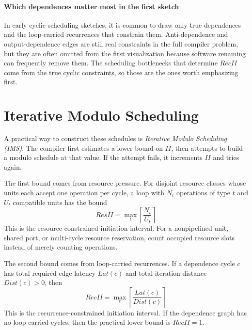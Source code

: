 \paragraph{Which dependences matter most in the first sketch}\label{par:ilp-swpipe-dep-simplify}
In early cyclic-scheduling sketches, it is common to draw only true dependences and the loop-carried recurrences that constrain them.
Anti-dependence and output-dependence edges are still real constraints in the full compiler problem, but they are often omitted from the first visualization because software renaming can frequently remove them.
The scheduling bottlenecks that determine $RecII$ come from the true cyclic constraints, so those are the ones worth emphasizing first.


\section{Iterative Modulo Scheduling}\label{sec:ilp-iterative-modulo-scheduling}
A practical way to construct these schedules is \textit{Iterative Modulo Scheduling (IMS)}.
The compiler first estimates a lower bound on $II$, then attempts to build a modulo schedule at that value.
If the attempt fails, it increments $II$ and tries again.

The first bound comes from resource pressure.
For disjoint resource classes whose units each accept one operation per cycle, a loop with $N_t$ operations of type $t$ and $U_t$ compatible units has the bound
\begin{equation}\label{eq:ilp-res-ii}
    ResII=\max_t \left\lceil \frac{N_t}{U_t} \right\rceil
\end{equation}
This is the resource-constrained initiation interval.
For a nonpipelined unit, shared port, or multi-cycle resource reservation, count occupied resource slots instead of merely counting operations.

The second bound comes from loop-carried recurrences.
If a dependence cycle $c$ has total required edge latency $Lat(c)$ and total iteration distance $Dist(c)>0$, then
\begin{equation}\label{eq:ilp-rec-ii}
    RecII=\max_c \left\lceil \frac{Lat(c)}{Dist(c)} \right\rceil
\end{equation}
This is the recurrence-constrained initiation interval.
If the dependence graph has no loop-carried cycles, then the practical lower bound is $RecII=1$.

